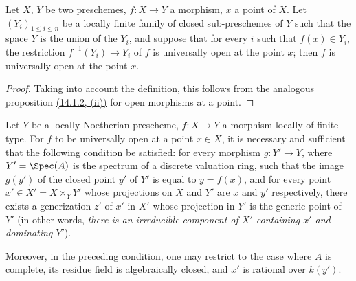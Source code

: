 \begin{proposition}[14.3.5]
\label{IV.14.3.5}
Let $X$, $Y$ be two preschemes, $f:X\to Y$ a morphism, $x$ a point of $X$.
Let $(Y_i)_{1\leq i\leq n}$ be a locally finite family of closed sub-preschemes of $Y$ such that the space $Y$ is the union of the $Y_i$, and suppose that for every $i$ such that $f(x)\in Y_i$, the restriction $f^{-1}(Y_i)\to Y_i$ of $f$ is universally open at the point $x$; then $f$ is universally open at the point $x$.
\end{proposition}

\begin{proof}
Taking into account the definition, this follows from the analogous proposition {\hyperlink{ega4.c04.prop.14-1-2}{(14.1.2, (ii))}} for open morphisms at a point.
\end{proof}

\begin{proposition}[14.3.6]
\label{IV.14.3.6}
Let $Y$ be a locally Noetherian prescheme, $f:X\to Y$ a morphism locally of finite type.
For $f$ to be universally open at a point $x\in X$, it is necessary and sufficient that the following condition be satisfied: for every morphism $g:Y'\to Y$, where $Y'=\Spec(A)$ is the spectrum of a discrete valuation ring, such that the image $g(y')$ of the closed point $y'$ of $Y'$ is equal to $y=f(x)$, and for every point $x'\in X'=X\times_Y Y'$ whose projections on $X$ and $Y'$ are $x$ and $y'$ respectively, there exists a generization $z'$ of $x'$ in $X'$ whose projection in $Y'$ is the generic point of $Y'$ (in other words, \emph{there is an irreducible component of $X'$ containing $x'$ and dominating $Y'$}).


Moreover, in the preceding condition, one may restrict to the case where $A$ is complete, its residue field is algebraically closed, and $x'$ is rational over $k(y')$.
\end{proposition}


